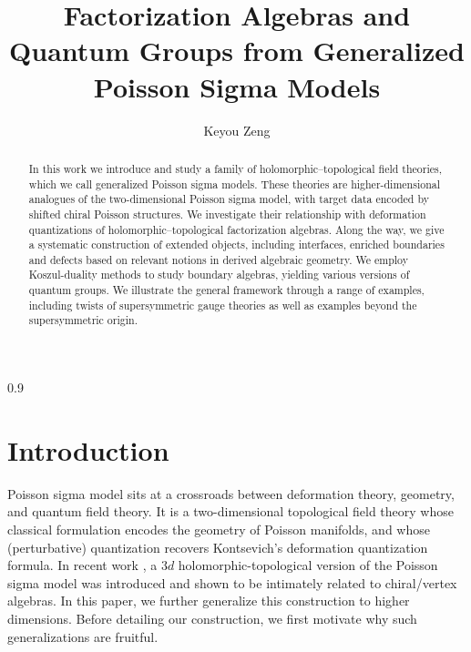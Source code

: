 \documentclass[11pt]{article}
\numberwithin{equation}{section}
\begin{document}
	
	\title{Factorization Algebras and Quantum Groups from Generalized Poisson Sigma Models}
\date{\vspace{-3ex}}
	\author{Keyou Zeng}
	
	

	
	
	
	
	
	
	
	
	\maketitle
	\begin{abstract}
In this work we introduce and study a family of holomorphic--topological field theories, which we call generalized Poisson sigma models. These theories are higher-dimensional analogues of the two-dimensional Poisson sigma model, with target data encoded by shifted chiral Poisson structures. We investigate their relationship with deformation quantizations of holomorphic--topological factorization algebras. Along the way, we give a systematic construction of extended objects, including interfaces, enriched boundaries and defects based on relevant notions in derived algebraic geometry. We employ Koszul-duality methods to study boundary algebras, yielding various versions of quantum groups. We illustrate the general framework through a range of examples, including twists of supersymmetric gauge theories as well as examples beyond the supersymmetric origin.
	\end{abstract}
	\setcounter{tocdepth}{1}
	\begin{spacing}{0.9}
    	\tableofcontents 
	\end{spacing}	
	\section{Introduction}
	Poisson sigma model sits at a crossroads between deformation theory, geometry, and quantum field theory. It is a two-dimensional topological field theory whose classical formulation encodes the geometry of Poisson manifolds, and whose (perturbative) quantization recovers Kontsevich's deformation quantization formula. In recent work \cite{khan2025poisson}, a $3d$ holomorphic-topological version of the Poisson sigma model was introduced and shown to be intimately related to chiral/vertex algebras. In this paper, we further generalize this construction to higher dimensions. Before detailing our construction, we first motivate why such generalizations are fruitful.
	
\end{document}
